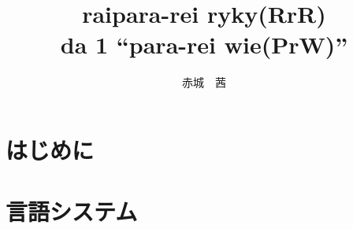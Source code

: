 \documentclass[a4paper, 12pt, titlepage]{ltjsarticle}
\title{raipara-rei ryky(RrR) \\ \small da 1 ``para-rei wie(PrW)''}
\author{赤城　茜}
\begin{document}
\maketitle

\tableofcontents
\clearpage

\part{はじめに}


\clearpage

\part{言語システム}



\clearpage
\end{document}
